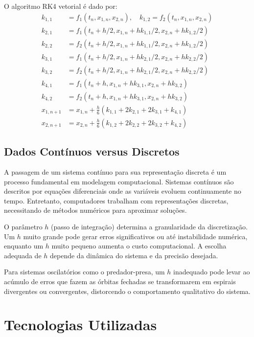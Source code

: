 \documentclass[11pt,a4paper]{article}
\begin{document}
O algoritmo RK4 vetorial é dado por:
\begin{align}
    k_{1,1} &= f_1(t_n, x_{1,n}, x_{2,n}), \quad k_{1,2} = f_2(t_n, x_{1,n}, x_{2,n}) \\
    k_{2,1} &= f_1(t_n + h/2, x_{1,n} + hk_{1,1}/2, x_{2,n} + hk_{1,2}/2) \\
    k_{2,2} &= f_2(t_n + h/2, x_{1,n} + hk_{1,1}/2, x_{2,n} + hk_{1,2}/2) \\
    k_{3,1} &= f_1(t_n + h/2, x_{1,n} + hk_{2,1}/2, x_{2,n} + hk_{2,2}/2) \\
    k_{3,2} &= f_2(t_n + h/2, x_{1,n} + hk_{2,1}/2, x_{2,n} + hk_{2,2}/2) \\
    k_{4,1} &= f_1(t_n + h, x_{1,n} + hk_{3,1}, x_{2,n} + hk_{3,2}) \\
    k_{4,2} &= f_2(t_n + h, x_{1,n} + hk_{3,1}, x_{2,n} + hk_{3,2}) \\
    x_{1,n+1} &= x_{1,n} + \frac{h}{6}(k_{1,1} + 2k_{2,1} + 2k_{3,1} + k_{4,1}) \\
    x_{2,n+1} &= x_{2,n} + \frac{h}{6}(k_{1,2} + 2k_{2,2} + 2k_{3,2} + k_{4,2})
\end{align}

\subsection{Dados Contínuos versus Discretos}

A passagem de um sistema contínuo para sua representação discreta é um processo fundamental em modelagem computacional. Sistemas contínuos são descritos por equações diferenciais onde as variáveis evoluem continuamente no tempo. Entretanto, computadores trabalham com representações discretas, necessitando de métodos numéricos para aproximar soluções.

O parâmetro $h$ (passo de integração) determina a granularidade da discretização. Um $h$ muito grande pode gerar erros significativos ou até instabilidade numérica, enquanto um $h$ muito pequeno aumenta o custo computacional. A escolha adequada de $h$ depende da dinâmica do sistema e da precisão desejada.

Para sistemas oscilatórios como o predador-presa, um $h$ inadequado pode levar ao acúmulo de erros que fazem as órbitas fechadas se transformarem em espirais divergentes ou convergentes, distorcendo o comportamento qualitativo do sistema.

\section{Tecnologias Utilizadas}
\end{document}
